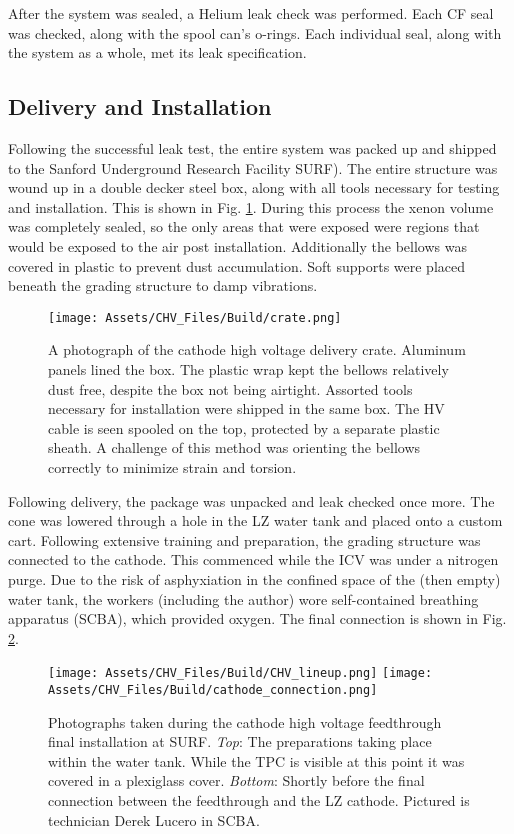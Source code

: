 After the system was sealed, a Helium leak check was performed.
Each CF seal was checked, along with the spool can's o-rings.
Each individual seal, along with the system as a whole, met its leak specification.

\subsection{Delivery and Installation}
Following the successful leak test, the entire system was packed up and shipped to the Sanford Underground Research Facility SURF).
The entire structure was wound up in a double decker steel box, along with all tools necessary for testing and installation.
This is shown in Fig. \ref{fig:crate}.
During this process the xenon volume was completely sealed, so the only areas that were exposed were regions that would be exposed to the air post installation.
Additionally the bellows was covered in plastic to prevent dust accumulation.
Soft supports were placed beneath the grading structure to damp vibrations.

\begin{figure}
    \centering
    \texttt{[image: Assets/CHV\_Files/Build/crate.png]}
    \caption[A photograph of the cathode high voltage delivery crate.
    Aluminum panels lined the box. ]%
    {A photograph of the cathode high voltage delivery crate.
    Aluminum panels lined the box. 
    The plastic wrap kept the bellows relatively dust free, despite the box not being airtight.
    Assorted tools necessary for installation were shipped in the same box.
    The HV cable is seen spooled on the top, protected by a separate plastic sheath. 
    A challenge of this method was orienting the bellows correctly to minimize strain and torsion.}
    \label{fig:crate}
\end{figure}

Following delivery, the package was unpacked and leak checked once more.
The cone was lowered through a hole in the LZ water tank and placed onto a custom cart.
Following extensive training and preparation, the grading structure was connected to the cathode.
This commenced while the ICV was under a nitrogen purge. 
Due to the risk of asphyxiation in the confined space of the (then empty) water tank, the workers (including the author) wore self-contained breathing apparatus (SCBA), which provided oxygen.
The final connection is shown in Fig. \ref{fig:lineup}.

\begin{figure}
    \centering
    \texttt{[image: Assets/CHV\_Files/Build/CHV\_lineup.png]}
     \texttt{[image: Assets/CHV\_Files/Build/cathode\_connection.png]}
    \caption[Photographs taken during the  cathode high voltage feedthrough final installation at SURF.]%
    {Photographs taken during the  cathode high voltage feedthrough final installation at SURF.
    \textit{Top}: The preparations taking place within the water tank. While the TPC is visible at this point it was covered in a plexiglass cover.
    \textit{Bottom}: Shortly before the final connection between the feedthrough and the LZ cathode. Pictured is technician Derek Lucero in SCBA.}
    \label{fig:lineup}
\end{figure}

